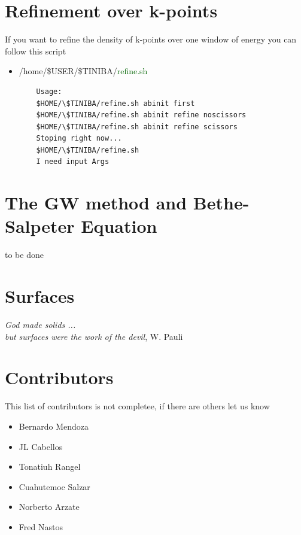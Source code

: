 \documentclass[12pt,leqno]{article}
\numberwithin{equation}{section}
\begin{document}
\section{Refinement over k-points}
If you want to refine the density of k-points over one window of energy 
you can follow this script 
\begin{itemize}
 \item /home/\$USER/\$TINIBA/\textcolor{darkgreen}{refine.sh} 
\begin{verbatim}
	Usage:
	$HOME/\$TINIBA/refine.sh abinit first
	$HOME/\$TINIBA/refine.sh abinit refine noscissors
	$HOME/\$TINIBA/refine.sh abinit refine scissors
	Stoping right now...
	$HOME/\$TINIBA/refine.sh
	I need input Args
\end{verbatim}

\end{itemize}


\section{The GW method and Bethe-Salpeter Equation}
to be done 


\section{Surfaces }
\emph{God made solids ...\\
      but surfaces were the work of the devil}, W. Pauli\\                                  



\section{Contributors}
This list of contributors is not completee, if there are others let us know
\begin{itemize}
\item Bernardo Mendoza
\item JL Cabellos
\item Tonatiuh Rangel
\item Cuahutemoc Salzar
\item Norberto Arzate
\item Fred Nastos  
\end{itemize}
\end{document}
